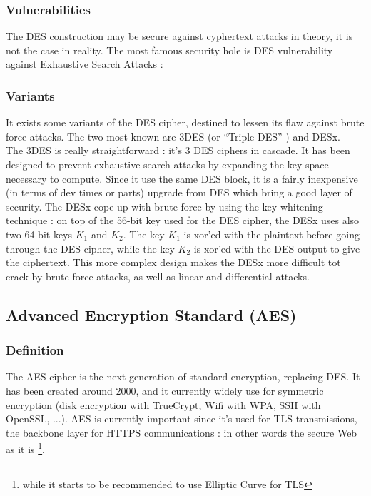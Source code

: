 \subsubsection{ Vulnerabilities }

The DES construction may be secure against cyphertext attacks in theory, it is not the case in reality. The most famous security hole is DES vulnerability against Exhaustive Search Attacks : 	

\subsubsection{Variants}

It exists some variants of the DES cipher, destined to lessen its flaw against brute force attacks. The two most known are 3DES (or ``Triple DES'' ) and DESx. \\
The 3DES is really straightforward : it's 3 DES ciphers in cascade. It has been designed to prevent exhaustive search attacks by expanding the key space necessary to compute. Since it use the same DES block, it is a fairly inexpensive (in terms of dev times or parts) upgrade from DES which bring a good layer of security.
The DESx cope up with brute force by using the key whitening technique : on top of the 56-bit key used for the DES cipher, the DESx uses also two 64-bit keys $K_1$ and $K_2$. The key $K_1$ is xor'ed with the plaintext before going through the DES cipher, while the key $K_2$ is xor'ed with the DES output to give the ciphertext. This more complex design makes the DESx more difficult tot crack by brute force attacks, as well as linear and differential attacks.

\subsection{Advanced Encryption Standard (AES)}

\subsubsection{Definition}

The AES cipher is the next generation of standard encryption, replacing DES. It has been created around 2000, and it currently widely use for symmetric encryption (disk encryption with TrueCrypt, Wifi with WPA, SSH with OpenSSL, ...). AES is currently important since it's used for TLS transmissions, the backbone layer for HTTPS communications : in other words the secure Web as it is \footnote{while it starts to be recommended to use Elliptic Curve for TLS}.

